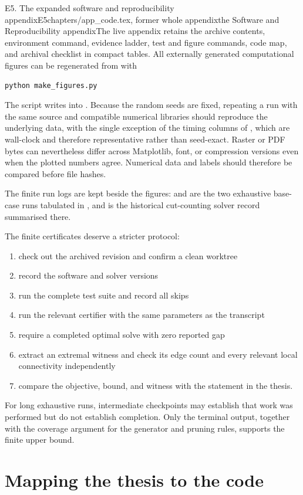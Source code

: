 \begin{offcut}{E5. The expanded software and reproducibility appendix}{E5}{chapters/app\_code.tex, former whole appendix}{the Software and Reproducibility appendix}{The live appendix retains the archive contents, environment command, evidence ladder, test and figure commands, code map, and archival checklist in compact tables.}
All externally generated computational figures can be regenerated from  with

\begin{verbatim}
python make_figures.py
\end{verbatim}
The script writes into . Because the random seeds are fixed, repeating a run with the same source and compatible numerical libraries should reproduce the underlying data, with the single exception of the timing columns of , which are wall-clock and therefore representative rather than seed-exact. Raster or PDF bytes can nevertheless differ across Matplotlib, font, or compression versions even when the plotted numbers agree. Numerical data and labels should therefore be compared before file hashes.

The finite run logs are kept beside the figures:  and  are the two exhaustive base-case runs tabulated in , and  is the historical cut-counting solver record summarised there.

The finite certificates deserve a stricter protocol:

\begin{enumerate}
  \item check out the archived revision and confirm a clean worktree
  \item record the software and solver versions
  \item run the complete test suite and record all skips
  \item run the relevant certifier with the same parameters as the transcript
  \item require a completed optimal solve with zero reported gap
  \item extract an extremal witness and check its edge count and every relevant local connectivity independently
  \item compare the objective, bound, and witness with the statement in the thesis.
\end{enumerate}

For long exhaustive runs, intermediate checkpoints may establish that work was performed but do not establish completion. Only the terminal output, together with the coverage argument for the generator and pruning rules, supports the finite upper bound.

\section{Mapping the thesis to the code}


\end{offcut}
